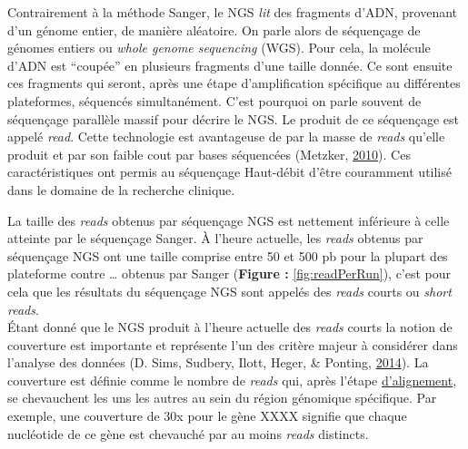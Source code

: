 \documentclass[12pt,twoside]{reedthesis}
\theoremstyle{definition}
\theoremstyle{definition}
\theoremstyle{remark}
\begin{document}
  Contrairement à la méthode Sanger, le NGS \emph{lit} des fragments
  d'ADN, provenant d'un génome entier, de manière aléatoire. On parle
  alors de séquençage de génomes entiers ou \emph{whole genome sequencing}
  (WGS). Pour cela, la molécule d'ADN est ``coupée'' en plusieurs
  fragments d'une taille donnée. Ce sont ensuite ces fragments qui seront,
  après une étape d'amplification spécifique au différentes plateformes,
  séquencés simultanément. C'est pourquoi on parle souvent de séquençage
  parallèle massif pour décrire le NGS. Le produit de ce séquençage est
  appelé \emph{read}. Cette technologie est avantageuse de par la masse de
  \emph{reads} qu'elle produit et par son faible cout par bases séquencées
  (Metzker, \protect\hyperlink{ref-Metzker2010}{2010}). Ces
  caractéristiques ont permis au séquençage Haut-débit d'être couramment
  utilisé dans le domaine de la recherche clinique.
  
  La taille des \emph{reads} obtenus par séquençage NGS est nettement
  inférieure à celle atteinte par le séquençage Sanger. À l'heure
  actuelle, les \emph{reads} obtenus par séquençage NGS ont une taille
  comprise entre 50 et 500 pb pour la plupart des plateforme contre
  \ldots{} obtenus par Sanger (\textbf{Figure :} \ref{fig:readPerRun}),
  c'est pour cela que les résultats du séquençage NGS sont appelés des
  \emph{reads} courts ou \emph{short reads}.\\
  Étant donné que le NGS produit à l'heure actuelle des \emph{reads}
  courts la notion de couverture est importante et représente l'un des
  critère majeur à considérer dans l'analyse des données (D. Sims,
  Sudbery, Ilott, Heger, \& Ponting,
  \protect\hyperlink{ref-Sims2014}{2014}). La couverture est définie comme
  le nombre de \emph{reads} qui, après l'étape
  \protect\hyperlink{lalignement}{d'alignement}, se chevauchent les uns
  les autres au sein du région génomique spécifique. Par exemple, une
  couverture de 30x pour le gène XXXX signifie que chaque nucléotide de ce
  gène est chevauché par au moins \emph{reads} distincts.
  
\end{document}
